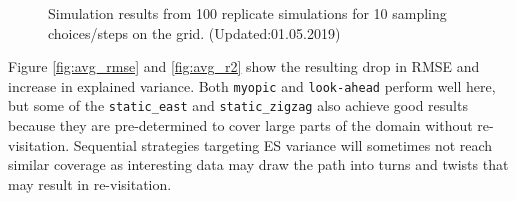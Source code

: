 \documentclass[aoas]{imsart}
\begin{document}
\begin{figure}[h!]
\caption{Simulation results from 100 replicate simulations for 10
  sampling choices/steps on the grid. (Updated:01.05.2019)} 
\label{fig:sim_results}
\end{figure}

Figure \ref{fig:avg_rmse} and \ref{fig:avg_r2} show the resulting drop in RMSE and increase in explained variance. Both \texttt{myopic} and \texttt{look-ahead} perform well here, but some of the \texttt{static\_east} and \texttt{static\_zigzag} also achieve good results because they are pre-determined to cover large parts of the domain without re-visitation. Sequential strategies targeting ES variance will sometimes not reach similar coverage as interesting data may draw the path into turns and twists that may result in re-visitation. 

\begin{figure}[!b]
  \centering
  \hfill
  \hfill

\end{figure}
\end{document}
